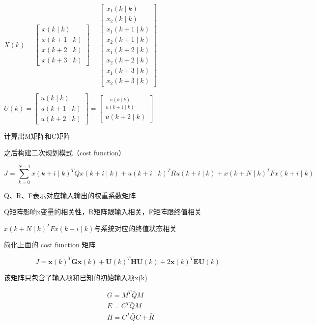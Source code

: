 $X(k)=\left[\begin{array}{c}x(k \mid k) \\x(k+1 \mid k) \\x(k+2 \mid k) \\x(k+3 \mid k)\end{array}\right]=\left[\begin{array}{c}x_{1}(k \mid k) \\x_{2}(k \mid k) \\x_{1}(k+1 \mid k) \\x_{2}(k+1 \mid k) \\x_{1}(k+2 \mid k) \\x_{2}(k+2 \mid k) \\x_{1}(k+3 \mid k) \\x_{2}(k+3 \mid k)\end{array}\right]$

$U(k)=\left[\begin{array}{c}u(k \mid k) \\u(k+1 \mid k) \\u(k+2 \mid k)\end{array}\right]=\left[\begin{array}{c}\frac{u(k \mid k)}{u(k+1 \mid k)} \\u(k+2 \mid k)\end{array}\right]$

计算出M矩阵和C矩阵

之后构建二次规划模式（cost function）

$$
J=\sum_{k=0}^{N-1} x(k+i \mid k)^{T} Q x(k+i \mid k)+u(k+i \mid k)^{T} R u(k+i \mid k)+x(k+N \mid k)^{T} F x(k+i \mid k)
$$

Q、R、F表示对应输入输出的权重系数矩阵

Q矩阵影响x变量的相关性，R矩阵跟输入相关，F矩阵跟终值相关

$x(k+N \mid k)^{T} F x(k+i \mid k)$与系统对应的终值状态相关

简化上面的 cost function 矩阵

$$
J=\boldsymbol{x}(k)^{T} \boldsymbol{G} \boldsymbol{x}(k)+\boldsymbol{U}(k)^{T} \boldsymbol{H} \boldsymbol{U}(k)+2 \boldsymbol{x}(k)^{T} \boldsymbol{E} \boldsymbol{U}(k)
$$

该矩阵只包含了输入项和已知的初始输入项x(k)

$$
\begin{aligned}&G=M^{T} \bar{Q} M \\&E=C^{T} \bar{Q} M \\&H=C^{T} \bar{Q} C+\bar{R}\end{aligned}
$$


